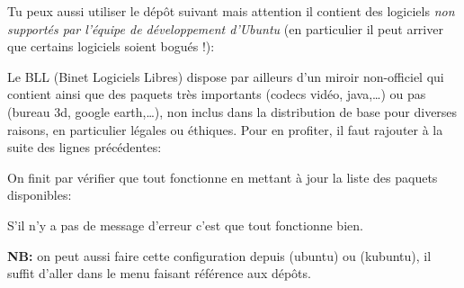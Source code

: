 Tu peux aussi utiliser le dép\^ot suivant mais attention il contient des logiciels \emph{non supportés par l'équipe de développement d'Ubuntu} (en particulier il peut arriver que certains logiciels soient bogués !):

Le BLL (Binet Logiciels Libres) dispose par ailleurs d'un miroir non-officiel qui contient  ainsi que des paquets très importants (codecs
vidéo, java,\dots) ou pas (bureau 3d, google earth,\dots), non inclus dans la distribution de base pour diverses raisons, en particulier légales ou
éthiques. Pour en profiter, il faut rajouter à la suite des lignes précédentes:



On finit par vérifier que tout fonctionne en mettant à jour la liste
des paquets disponibles:


S'il n'y a pas de message d'erreur c'est que tout fonctionne bien.

\textbf{NB:} on peut aussi faire cette configuration depuis  (ubuntu) ou  (kubuntu), il suffit d'aller dans le menu faisant référence aux dép\^ots.
